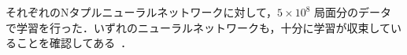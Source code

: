 それぞれのNタプルニューラルネットワークに対して，$5\times 10^8$ 局面分のデータで学習を行った．いずれのニューラルネットワークも，十分に学習が収束していることを確認してある~\cite{TeKM23}．




